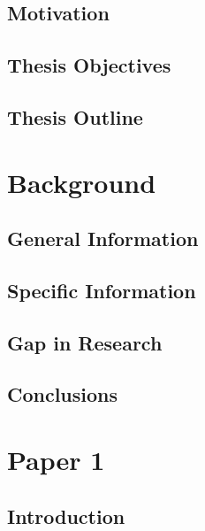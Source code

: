   \section{Motivation}\label{sec:Motivation}
    \lipsum[1-3]
  \section{Thesis Objectives}\label{sec:thesisObjective}
    \lipsum[14-16]
  \section{Thesis Outline}\label{sec:thesisOutline}
    \lipsum[17]


% 
                
\chapter{Background}\label{ch:Background}
  \section{General Information}\label{sec:GenInfo}
    \lipsum[23-25]
  \section{Specific Information}\label{sec:SpecInfo}
    \lipsum[35-37]
  \section{Gap in Research}\label{sec:ResearchGap}
    \lipsum[42-43]
  \section{Conclusions}\label{sec:BackConclusions}
    \lipsum[12-13]

\chapter{Paper 1}\label{ch:Paper1}
  \section{Introduction}\label{sec:P1Intro}
    \lipsum[34-36]
